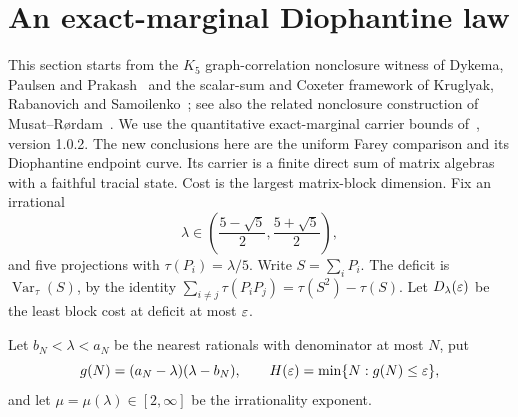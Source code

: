 \section{An exact-marginal Diophantine law}\label{sec:farey}
This section starts from the $K_5$ graph-correlation nonclosure witness of Dykema, Paulsen and Prakash~\cite{DPP} and the scalar-sum and Coxeter framework of Kruglyak, Rabanovich and Samoilenko~\cite{KRS}; see also the related nonclosure construction of Musat--R{\o}rdam~\cite{MR}. We use the quantitative exact-marginal carrier bounds of~\cite[Lemmas 4.4 and 4.6]{KFive}, version 1.0.2. The new conclusions here are the uniform Farey comparison and its Diophantine endpoint curve. Its carrier is a finite direct sum of matrix algebras with a faithful tracial state. Cost is the largest matrix-block dimension. Fix an irrational
\[
 \lambda\in\left(\frac{5-\sqrt5}{2},\frac{5+\sqrt5}{2}\right),
\]
and five projections with $\tau(P_i)=\lambda/5$. Write $S=\sum_iP_i$. The deficit is $\operatorname{Var}_\tau(S)$, by the identity $\sum_{i\ne j}\tau(P_iP_j)=\tau(S^2)-\tau(S)$. Let $D_\lambda(\varepsilon)$ be the least block cost at deficit at most $\varepsilon$.

Let $b_N<\lambda<a_N$ be the nearest rationals with denominator at most $N$, put
\[
 g(N)=(a_N-\lambda)(\lambda-b_N),\qquad
 H(\varepsilon)=\min\{N:g(N)\le\varepsilon\},
\]
and let $\mu=\mu(\lambda)\in[2,\infty]$ be the irrationality exponent.

